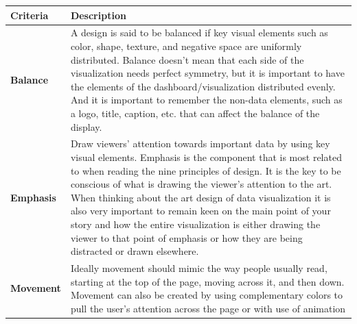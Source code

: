\documentclass[]{book}
\begin{document}
\begin{longtable}[]{@{}ll@{}}
\toprule
\begin{minipage}[b]{0.15\columnwidth}\raggedright
\textbf{Criteria}\strut
\end{minipage} & \begin{minipage}[b]{0.79\columnwidth}\raggedright
\textbf{Description}\strut
\end{minipage}\tabularnewline
\midrule
\endhead
\begin{minipage}[t]{0.15\columnwidth}\raggedright
\textbf{Balance}\strut
\end{minipage} & \begin{minipage}[t]{0.79\columnwidth}\raggedright
A design is said to be balanced if key visual elements such as color, shape, texture, and negative space are uniformly distributed. Balance doesn't mean that each side of the visualization needs perfect symmetry, but it is important to have the elements of the dashboard/visualization distributed evenly. And it is important to remember the non-data elements, such as a logo, title, caption, etc. that can affect the balance of the display.\strut
\end{minipage}\tabularnewline
\begin{minipage}[t]{0.15\columnwidth}\raggedright
\textbf{Emphasis}\strut
\end{minipage} & \begin{minipage}[t]{0.79\columnwidth}\raggedright
Draw viewers' attention towards important data by using key visual elements. Emphasis is the component that is most related to when reading the nine principles of design. It is the key to be conscious of what is drawing the viewer's attention to the art. When thinking about the art design of data visualization it is also very important to remain keen on the main point of your story and how the entire visualization is either drawing the viewer to that point of emphasis or how they are being distracted or drawn elsewhere.\strut
\end{minipage}\tabularnewline
\begin{minipage}[t]{0.15\columnwidth}\raggedright
\textbf{Movement}\strut
\end{minipage} & \begin{minipage}[t]{0.79\columnwidth}\raggedright
Ideally movement should mimic the way people usually read, starting at the top of the page, moving across it, and then down. Movement can also be created by using complementary colors to pull the user's attention across the page or with use of animation\strut

\end{minipage}
\end{longtable}
\end{document}
